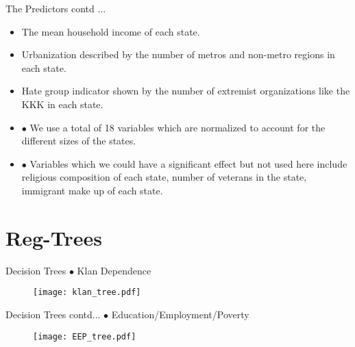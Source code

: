 \documentclass{beamer}
\begin{document}

\begin{frame}{The Predictors contd ... }

\begin{itemize}

\item {} {The mean household income of each state.}
\item {} {Urbanization described by the number of metros and non-metro regions in each state.}
\item {} {Hate group indicator shown by the number of extremist organizations like the KKK in each state.}

\item {} {$\bullet$ We use a total of 18 variables which are normalized to account for the different sizes of the states.}

\item {} {$\bullet$ Variables which we could have a significant effect but not used here include religious composition of each state, number of veterans in the state, immigrant make up of each state.}

\end{itemize}
\end{frame}


\section[ Visualizing the Dependencies]{Reg-Trees}

\begin{frame}{Decision Trees}
$\bullet$ Klan Dependence

\begin{figure}[h!]
	\begin{center}
		\texttt{[image: klan\_tree.pdf]}
		\end{center}
\end{figure}

\end{frame}


\begin{frame}{Decision Trees contd...}
$\bullet$ Education/Employment/Poverty

\begin{figure}[h!]
	\begin{center}
		\texttt{[image: EEP\_tree.pdf]}
		\end{center}
\end{figure}

\end{frame}
\end{document}
